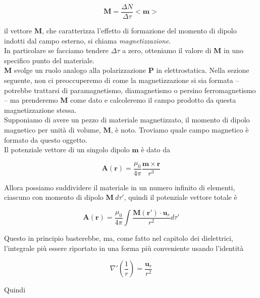 \begin{equation}
    \mathbf{M} = \frac{\Delta N}{\Delta \tau} <\mathbf{m}>
\end{equation}

il vettore $\mathbf{M}$, che caratterizza l'effetto di formazione del momento di dipolo indotti dal campo esterno, si chiama \emph{magnetizzazione}. \\
In particolare se facciamo tendere $\Delta \tau$ a zero, otteniamo il valore di $\mathbf{M}$ in uno specifico punto del materiale.\\

$\mathbf{M}$ svolge un ruolo analogo alla polarizzazione $\mathbf{P}$ in elettrostatica. Nella sezione seguente, non ci preoccuperemo di come
la magnetizzazione si sia formata – potrebbe trattarsi di paramagnetismo, diamagnetismo o persino ferromagnetismo – ma prenderemo $\mathbf{M}$ come dato e calcoleremo il campo prodotto da questa magnetizzazione stessa.\\

Supponiamo di avere un pezzo di materiale magnetizzato, il momento di dipolo magnetico per unità di volume, $\mathbf{M}$, è noto. Troviamo quale campo magnetico è formato da questo oggetto. \\

Il potenziale vettore di un singolo dipolo $\mathbf{m}$ è dato da 

\begin{equation*}
    \mathbf{A} (\mathbf{r}) = \frac{\mu_0}{4 \pi} \frac{\mathbf{m} \times \mathbf{r}}{r^3}
\end{equation*}

Allora possiamo suddividere il materiale in un numero infinito di elementi, ciascuno con momento di dipolo $\mathbf{M} \ d \tau'$, quindi il potenziale vettore totale è 

\begin{equation}
    \mathbf{A} (\mathbf{r}) = \frac{\mu_0}{4 \pi} \int \frac{\mathbf{M} (\mathbf{r'}) \cdot \mathbf{u}_r}{r^2} d \tau'
\end{equation}

Questo in principio basterebbe, ma, come fatto nel capitolo dei dielettrici, l'integrale più essere riportato in una forma più conveniente usando l'identità 

\begin{equation*}
    \nabla' \left( \frac{1}{r} \right) = \frac{\mathbf{u}_r}{r^2}
\end{equation*}

Quindi 

